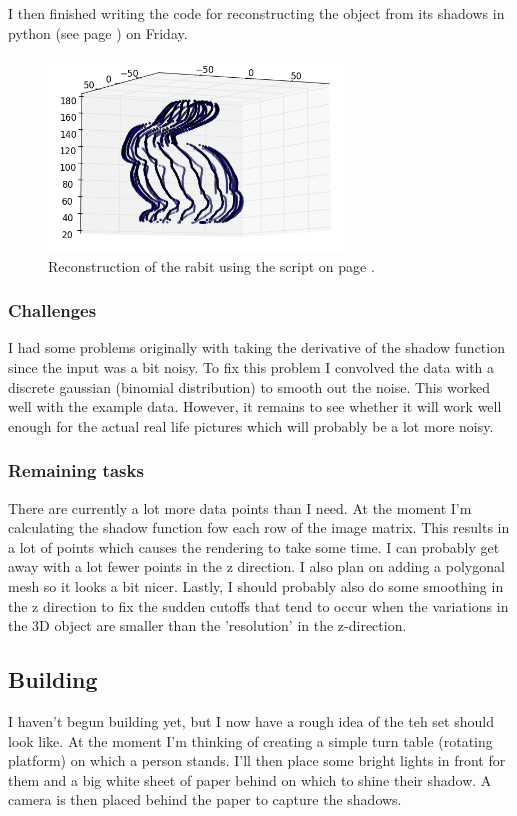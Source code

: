 \documentclass[a4paper]{article}
\begin{document}
I then finished writing the code for reconstructing the object from its shadows in python (see page \pageref{alg:shadow}) on Friday.

\begin{figure}[H]
  \centering
    \includegraphics[width=0.7\textwidth]{figures/rabit.png}
    \caption{Reconstruction of the rabit using the script on page \pageref{alg:shadow}.}
  \label{fig:f2}
\end{figure}

\subsubsection{Challenges}
I had some problems originally with taking the derivative of the shadow function since the input was a bit noisy.
To fix this problem I convolved the data with a discrete gaussian (binomial distribution) to smooth out the noise.
This worked well with the example data. 
However, it remains to see whether it will work well enough for the actual real life pictures which will probably be a lot more noisy.

\subsubsection{Remaining tasks}
There are currently a lot more data points than I need. At the moment I'm calculating the shadow function fow each row of the image matrix.
This results in a lot of points which causes the rendering to take some time.
I can probably get away with a lot fewer points in the z direction.
I also plan on adding a polygonal mesh so it looks a bit nicer.
Lastly, I should probably also do some smoothing in the z direction to fix the sudden cutoffs that tend to occur when the variations in the 3D object are smaller than the 'resolution' in the z-direction.

\subsection{Building}
I haven't begun building yet, but I now have a rough idea of the teh set should look like. 
At the moment I'm thinking of creating a simple turn table (rotating platform) on which a person stands. I'll then place some bright lights in front for them and a big white sheet of paper behind on which to shine their shadow. 
A camera is then placed behind the paper to capture the shadows.
\end{document}
